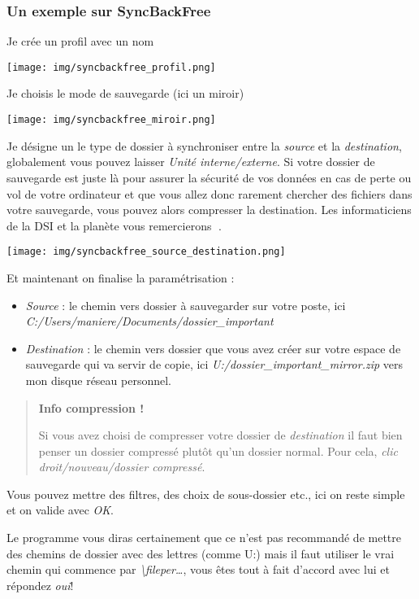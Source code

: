 \documentclass[
]{article}
\providecommand{\tightlist}{%
  \setlength{\itemsep}{0pt}\setlength{\parskip}{0pt}}
\begin{document}
\subsubsection{Un exemple sur
SyncBackFree}\label{un-exemple-sur-syncbackfree}

Je crée un profil avec un nom

\texttt{[image: img/syncbackfree\_profil.png]}

Je choisis le mode de sauvegarde (ici un miroir)

\texttt{[image: img/syncbackfree\_miroir.png]}

Je désigne un le type de dossier à synchroniser entre la \emph{source}
et la \emph{destination}, globalement vous pouvez laisser \emph{Unité
interne/externe}. Si votre dossier de sauvegarde est juste là pour
assurer la sécurité de vos données en cas de perte ou vol de votre
ordinateur et que vous allez donc rarement chercher des fichiers dans
votre sauvegarde, vous pouvez alors compresser la destination. Les
informaticiens de la DSI et la planète vous remercierons 🤗.

\texttt{[image: img/syncbackfree\_source\_destination.png]}

Et maintenant on finalise la paramétrisation :

\begin{itemize}
\tightlist
\item
  \emph{Source} : le chemin vers dossier à sauvegarder sur votre poste,
  ici \emph{C:/Users/maniere/Documents/dossier\_important}
\item
  \emph{Destination} : le chemin vers dossier que vous avez créer sur
  votre espace de sauvegarde qui va servir de copie, ici
  \emph{U:/dossier\_important\_mirror.zip} vers mon disque réseau
  personnel.
\end{itemize}

\begin{quote}
\textbf{Info compression !}

Si vous avez choisi de compresser votre dossier de \emph{destination} il
faut bien penser un dossier compressé plutôt qu'un dossier normal. Pour
cela, \emph{clic droit/nouveau/dossier compressé}.
\end{quote}

Vous pouvez mettre des filtres, des choix de sous-dossier etc., ici on
reste simple et on valide avec \emph{OK}.

Le programme vous diras certainement que ce n'est pas recommandé de
mettre des chemins de dossier avec des lettres (comme U:) mais il faut
utiliser le vrai chemin qui commence par
\emph{\textbackslash fileper\ldots{}}, vous êtes tout à fait d'accord
avec lui et répondez \emph{oui}!
\end{document}
